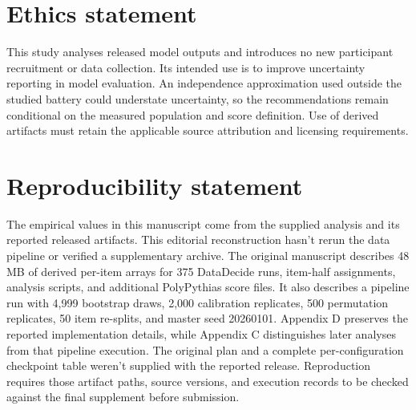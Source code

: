 \documentclass{article}
\begin{document}
\section*{Ethics statement}
This study analyses released model outputs and introduces no new participant recruitment or data collection. Its intended use is to improve uncertainty reporting in model evaluation. An independence approximation used outside the studied battery could understate uncertainty, so the recommendations remain conditional on the measured population and score definition. Use of derived artifacts must retain the applicable source attribution and licensing requirements.

\section*{Reproducibility statement}
The empirical values in this manuscript come from the supplied analysis and its reported released artifacts. This editorial reconstruction hasn't rerun the data pipeline or verified a supplementary archive. The original manuscript describes 48 MB of derived per-item arrays for 375 DataDecide runs, item-half assignments, analysis scripts, and additional PolyPythias score files. It also describes a pipeline run with 4,999 bootstrap draws, 2,000 calibration replicates, 500 permutation replicates, 50 item re-splits, and master seed 20260101. Appendix D preserves the reported implementation details, while Appendix C distinguishes later analyses from that pipeline execution. The original plan and a complete per-configuration checkpoint table weren't supplied with the reported release. Reproduction requires those artifact paths, source versions, and execution records to be checked against the final supplement before submission.


\clearpage
\appendix


\end{document}
